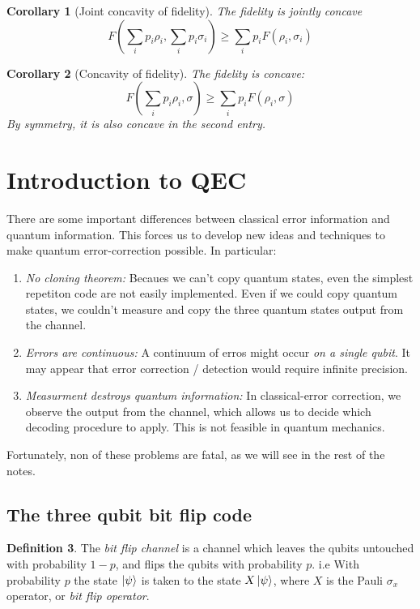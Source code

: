 \documentclass[11pt,a4paper]{article}
\theoremstyle{definition}
\newtheorem{definition}{Definition}[section]
\theoremstyle{plain}
\newtheorem{corollary}[definition]{Corollary}
\theoremstyle{remark}
\begin{document}
\begin{corollary}[Joint concavity of fidelity] \label{thm:joint-concavity-fidelity}
The fidelity is \emph{jointly concave}
$$F\left(\sum_i p_i \rho_i, \sum_i p_i \sigma_i\right) \geq \sum_i p_i F(\rho_i, \sigma_i)$$
\end{corollary}

\begin{corollary}[Concavity of fidelity] \label{thm:concavity-fidelity}
The fidelity is concave: 
$$F\left(\sum_i p_i \rho_i, \sigma\right) \geq \sum_i p_i F(\rho_i, \sigma)$$
By symmetry, it is also concave in the second entry.
\end{corollary}
\section{Introduction to QEC}
There are some important differences between classical error information and quantum information. 
This forces us to develop new ideas and techniques to make quantum error-correction possible. In particular: 
\begin{enumerate}
\item \emph{No cloning theorem:} Becaues we can't copy quantum states, even the simplest repetiton code are not easily implemented. 
Even if we could copy quantum states, we couldn't measure and copy the three quantum states output from the channel. 

\item \emph{Errors are continuous:} A continuum of erros might occur \emph{on a single qubit}. It may appear that error correction / detection 
would require infinite precision. 

\item \emph{Measurment destroys quantum information:} In classical-error correction, we observe the output from the channel, which allows us to 
decide which decoding procedure to apply. This is not feasible in quantum mechanics. 
\end{enumerate}
Fortunately, non of these problems are fatal, as we will see in the rest of the notes. 

\subsection{The three qubit bit flip code}

\begin{definition}
The \emph{bit flip channel} is a channel which leaves the qubits untouched with probability $1 - p$, and flips the qubits with probability $p$. 
i.e With probability $p$ the state $\ket{\psi}$ is taken to the state $X \ket{\psi}$, where $X$ is the Pauli $\sigma_x$ operator, or \emph{bit flip operator}. 
\end{definition}
\end{document}
